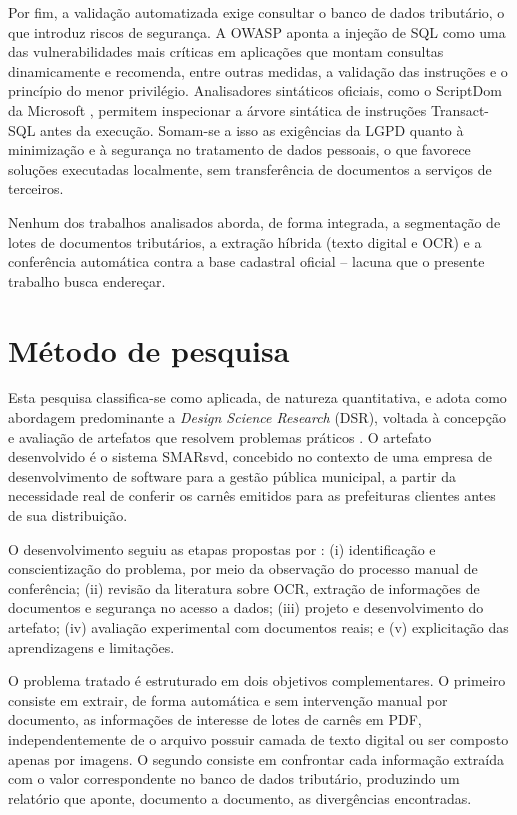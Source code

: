 \documentclass[article,12pt,oneside,a4paper,english,brazil]{abntex2}
\begin{document}
Por fim, a validação automatizada exige consultar o banco de dados tributário, o que
introduz riscos de segurança. A OWASP \cite{owasp} aponta a injeção de SQL como uma das
vulnerabilidades mais críticas em aplicações que montam consultas dinamicamente e
recomenda, entre outras medidas, a validação das instruções e o princípio do menor
privilégio. Analisadores sintáticos oficiais, como o ScriptDom da Microsoft
\cite{microsoftscriptdom}, permitem inspecionar a árvore sintática de instruções
Transact-SQL antes da execução. Somam-se a isso as exigências da LGPD
\cite{brasil2018lgpd} quanto à minimização e à segurança no tratamento de dados
pessoais, o que favorece soluções executadas localmente, sem transferência de
documentos a serviços de terceiros.

Nenhum dos trabalhos analisados aborda, de forma integrada, a segmentação de lotes de
documentos tributários, a extração híbrida (texto digital e OCR) e a conferência
automática contra a base cadastral oficial -- lacuna que o presente trabalho busca
endereçar.

\section{Método de pesquisa}\label{sec:metodo}

Esta pesquisa classifica-se como aplicada, de natureza quantitativa, e adota como
abordagem predominante a \textit{Design Science Research} (DSR), voltada à concepção e
avaliação de artefatos que resolvem problemas práticos
\cite{hevner2004,dresch2015}. O artefato desenvolvido é o sistema SMARsvd, concebido
no contexto de uma empresa de desenvolvimento de software para a gestão pública
municipal, a partir da necessidade real de conferir os carnês emitidos para as
prefeituras clientes antes de sua distribuição.

O desenvolvimento seguiu as etapas propostas por :
(i) identificação e conscientização do problema, por meio da observação do processo
manual de conferência; (ii) revisão da literatura sobre OCR, extração de informações de
documentos e segurança no acesso a dados; (iii) projeto e desenvolvimento do artefato;
(iv) avaliação experimental com documentos reais; e (v) explicitação das aprendizagens e
limitações.

O problema tratado é estruturado em dois objetivos complementares. O primeiro consiste
em extrair, de forma automática e sem intervenção manual por documento, as informações
de interesse de lotes de carnês em PDF, independentemente de o arquivo possuir camada
de texto digital ou ser composto apenas por imagens. O segundo consiste em confrontar
cada informação extraída com o valor correspondente no banco de dados tributário,
produzindo um relatório que aponte, documento a documento, as divergências encontradas.
\end{document}
